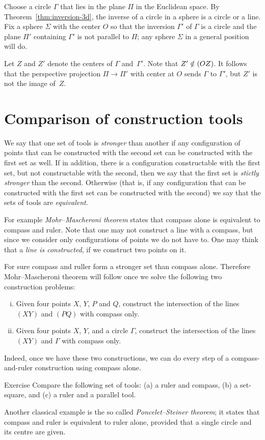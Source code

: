 Choose a circle $\Gamma$ that lies in the plane $\Pi$ in the Euclidean space.
By Theorem~\ref{thm:inversion-3d}, 
the inverse of a circle in a sphere is a circle or a line.
Fix a sphere $\Sigma$ with the center $O$ so that the inversion $\Gamma'$ of $\Gamma$
is a circle and the plane $\Pi'$ containing $\Gamma'$ is not parallel to $\Pi$;
any sphere $\Sigma$ in a general position will do.

Let $Z$ and $Z'$ denote the centers of $\Gamma$ and~$\Gamma'$.
Note that  $Z'\z\notin(OZ)$.
It follows that the perspective projection $\Pi\to \Pi'$ with center at $O$ sends $\Gamma$ to $\Gamma'$, but $Z'$ is not the image of~$Z$.
\qeds

\section*{Comparison of construction tools}

We say that one set of tools is \emph{stronger} than another if any configuration of points that can be constructed with the second set can be constructed with the first set as well.
If in addition, there is a configuration constructable with the first set, but not constructable with the second, then we say that the first set is \emph{stictly stronger} than the second.
Otherwise (that is, if any configuration that can be constructed with the first set can be constructed with the second) we say that the sets of tools are \emph{equivalent}. 

For example \emph{Mohr--Mascheroni theorem} states that compass alone is equivalent to compass and ruler.
Note that one may not construct a line with a compass, but since we consider only configurations of points we do not have to.
One may think that a \emph{line is constructed}, if we construct two points on it.

For sure compass and ruller form a stronger set than compass alone.
Therefore Mohr--Mascheroni theorem will follow once we solve the following two construction problems:
\begin{enumerate}[(i)]
\item Given four points $X$, $Y$, $P$ and $Q$, construct the intersection of the lines $(XY)$ and $(PQ)$ with compass only.
\item  Given four points $X$, $Y$, and a circle $\Gamma$, construct the intersection of the lines $(XY)$ and $\Gamma$ with compass only.
\end{enumerate}
Indeed, once we have these two constructions, we can do every step of a compass-and-ruler construction using compass alone.

\begin{thm}{Exercise}\label{ex:comparison}
Compare the following set of tools: (a) a ruler and compass, (b) a set-square, and (c) a ruler and a parallel tool.
\end{thm}

Another classical example is the so called \emph{Poncelet--Steiner theorem};
it states that compass and ruler is equivalent to ruler alone, provided that a single circle and its centre are given.

